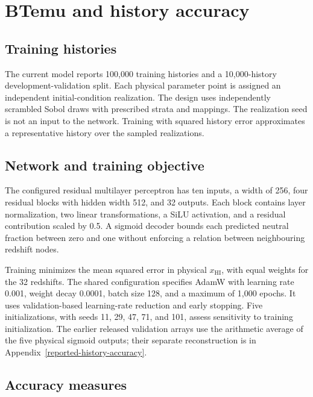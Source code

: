 \section{BTemu and history accuracy}\label{btemu-a-surrogate-for-neutral-fraction-histories}

\subsection{Training histories}\label{training-data-and-initial-conditions}

The current model reports 100,000 training histories and a 10,000-history development-validation split. Each physical parameter point is assigned an independent initial-condition realization. The design uses independently scrambled Sobol draws with prescribed strata and mappings. The realization seed is not an input to the network. Training with squared history error approximates a representative history over the sampled realizations.

\subsection{Network and training objective}\label{network-and-training-objective}

The configured residual multilayer perceptron has ten inputs, a width of 256, four residual blocks with hidden width 512, and 32 outputs. Each block contains layer normalization, two linear transformations, a SiLU activation, and a residual contribution scaled by 0.5. A sigmoid decoder bounds each predicted neutral fraction between zero and one without enforcing a relation between neighbouring redshift nodes.

Training minimizes the mean squared error in physical \ensuremath{x_{\mathrm{HI}}}, with equal weights for the 32 redshifts. The shared configuration specifies AdamW with learning rate 0.001, weight decay 0.0001, batch size 128, and a maximum of 1,000 epochs. It uses validation-based learning-rate reduction and early stopping. Five initializations, with seeds 11, 29, 47, 71, and 101, assess sensitivity to training initialization. The earlier released validation arrays use the arithmetic average of the five physical sigmoid outputs; their separate reconstruction is in Appendix~\ref{reported-history-accuracy}.


\subsection{Accuracy measures}\label{accuracy-measures}

